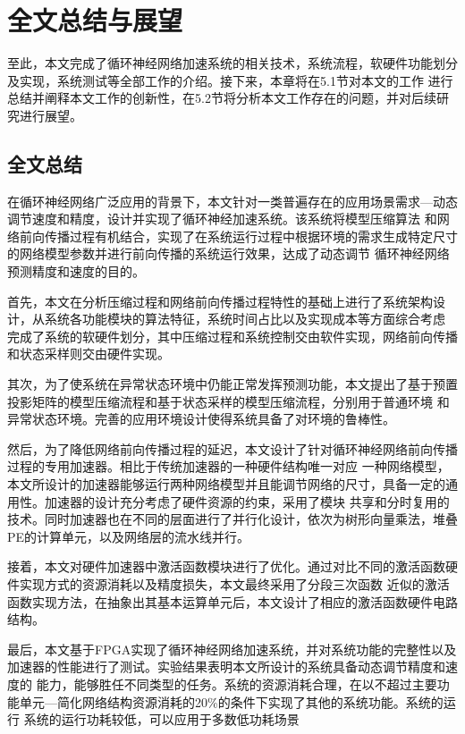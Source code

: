 \chapter{全文总结与展望}
至此，本文完成了循环神经网络加速系统的相关技术，系统流程，软硬件功能划分及实现，系统测试等全部工作的介绍。接下来，本章将在5.1节对本文的工作
进行总结并阐释本文工作的创新性，在5.2节将分析本文工作存在的问题，并对后续研究进行展望。
\section{全文总结}
在循环神经网络广泛应用的背景下，本文针对一类普遍存在的应用场景需求---动态调节速度和精度，设计并实现了循环神经加速系统。该系统将模型压缩算法
和网络前向传播过程有机结合，实现了在系统运行过程中根据环境的需求生成特定尺寸的网络模型参数并进行前向传播的系统运行效果，达成了动态调节
循环神经网络预测精度和速度的目的。

首先，本文在分析压缩过程和网络前向传播过程特性的基础上进行了系统架构设计，从系统各功能模块的算法特征，系统时间占比以及实现成本等方面综合考虑
完成了系统的软硬件划分，其中压缩过程和系统控制交由软件实现，网络前向传播和状态采样则交由硬件实现。

其次，为了使系统在异常状态环境中仍能正常发挥预测功能，本文提出了基于预置投影矩阵的模型压缩流程和基于状态采样的模型压缩流程，分别用于普通环境
和异常状态环境。完善的应用环境设计使得系统具备了对环境的鲁棒性。

然后，为了降低网络前向传播过程的延迟，本文设计了针对循环神经网络前向传播过程的专用加速器。相比于传统加速器的一种硬件结构唯一对应
一种网络模型，本文所设计的加速器能够运行两种网络模型并且能调节网络的尺寸，具备一定的通用性。加速器的设计充分考虑了硬件资源的约束，采用了模块
共享和分时复用的技术。同时加速器也在不同的层面进行了并行化设计，依次为树形向量乘法，堆叠PE的计算单元，以及网络层的流水线并行。

接着，本文对硬件加速器中激活函数模块进行了优化。通过对比不同的激活函数硬件实现方式的资源消耗以及精度损失，本文最终采用了分段三次函数
近似的激活函数实现方法，在抽象出其基本运算单元后，本文设计了相应的激活函数硬件电路结构。

最后，本文基于FPGA实现了循环神经网络加速系统，并对系统功能的完整性以及加速器的性能进行了测试。实验结果表明本文所设计的系统具备动态调节精度和速度的
能力，能够胜任不同类型的任务。系统的资源消耗合理，在以不超过主要功能单元---简化网络结构资源消耗的20\%的条件下实现了其他的系统功能。系统的运行
系统的运行功耗较低，可以应用于多数低功耗场景

